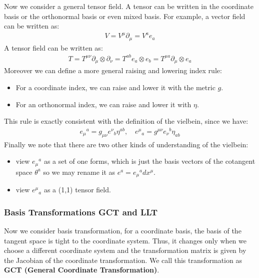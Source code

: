 Now we consider a general tensor field. A tensor can be written in
the coordinate basis or the orthonormal basis or even mixed basis.
For example, a vector field can be written as:
\begin{align}
  V = V^\mu \partial_{\mu} = V^a e_a
\end{align}
A tensor field can be written as:
\begin{align}
  T = T^{\mu\nu} \partial_{\mu} \otimes \partial_{\nu} = T^{ab} e_a
  \otimes e_b = T^{\mu a} \partial_{\mu} \otimes e_a
\end{align}
Moreover we can define a more general raising and lowering index rule:
\begin{itemize}
  \item For a coordinate index, we can raise and lower it with the metric $ g $.
  \item For an orthonormal index, we can raise and lower it with $ \eta $.
\end{itemize}
This rule is exactly consistent with the definition of the vielbein,
since we have:
\begin{align}
  e_\mu{}^a = g_{\mu\nu} e^\nu{}_b \eta^{ab}, \quad e^\mu{}_a =
  g^{\mu\nu} e_\nu{}^b \eta_{ab}
\end{align}
Finally we note that there are two other kinds of understanding of the vielbein:
\begin{itemize}
  \item view $ e_\mu{}^a$ as a set of one forms, which is just the
    basis vectors of the cotangent space $ \theta^a $ so we may
    rename it as $ e^a = e_\mu{}^a dx^\mu $.
  \item view $ e^\mu{}_a $ as a (1,1) tensor field.
\end{itemize}

\subsubsection{Basis Transformations GCT and LLT}

Now we consider basis transformation, for a coordinate basis, the
basis of the tangent space is tight to the coordinate system. Thus,
it changes only when we choose a different coordinate system and the
transformation matrix is given by the Jacobian of the coordinate
transformation. We call this transformation as \textbf{GCT (General
Coordinate Transformation)}.

